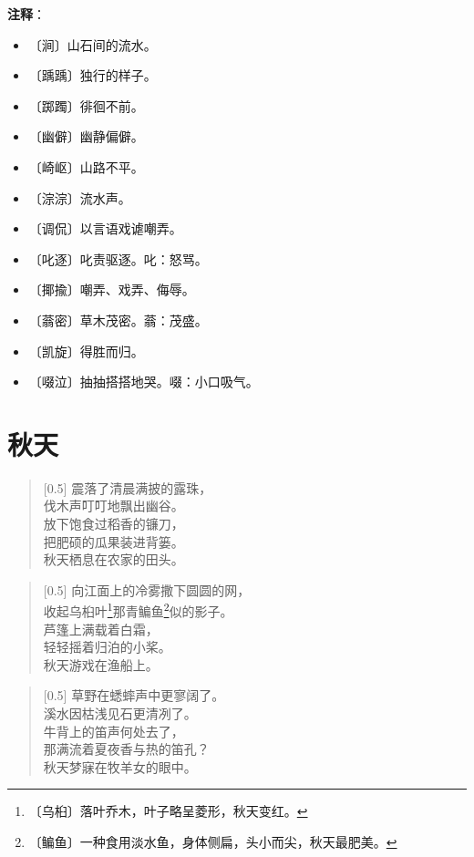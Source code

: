 \documentclass[12pt,UTF-8,openany]{ctexbook}
\begin{document}
\newpage

\textbf{注释}：

\vspace{-1em}

\begin{itemize}
    \setlength\itemsep{-0.2em}
    \item 〔涧〕山石间的流水。
    \item 〔踽踽〕独行的样子。
    \item 〔踯躅〕徘徊不前。
    \item 〔幽僻〕幽静偏僻。
    \item 〔崎岖〕山路不平。
    \item 〔淙淙〕流水声。
    \item 〔调侃〕以言语戏谑嘲弄。
    \item 〔叱逐〕叱责驱逐。叱：怒骂。
    \item 〔揶揄〕嘲弄、戏弄、侮辱。
    \item 〔蓊密〕草木茂密。蓊：茂盛。
    \item 〔凯旋〕得胜而归。
    \item 〔啜泣〕抽抽搭搭地哭。啜：小口吸气。
\end{itemize}

\chapter{秋天}

\begin{large}
    
    \begin{verse}[0.5\linewidth]
        震落了清晨满披的露珠， \\
        伐木声叮叮地飘出幽谷。 \\
        放下饱食过稻香的镰刀， \\
        把肥硕的瓜果装进背篓。 \\
        秋天栖息在农家的田头。
    \end{verse}
    
    
    \begin{verse}[0.5\linewidth]
        向江面上的冷雾撒下圆圆的网， \\
        收起乌桕叶\footnote{〔乌桕〕落叶乔木，叶子略呈菱形，秋天变红。}那青鳊鱼\footnote{〔鳊鱼〕一种食用淡水鱼，身体侧扁，头小而尖，秋天最肥美。}似的影子。 \\
        芦篷上满载着白霜， \\
        轻轻摇着归泊的小桨。 \\
        秋天游戏在渔船上。
    \end{verse}
    
    
    \begin{verse}[0.5\linewidth]
        草野在蟋蟀声中更寥阔了。 \\
        溪水因枯浅见石更清冽了。 \\
        牛背上的笛声何处去了， \\
        那满流着夏夜香与热的笛孔？ \\
        秋天梦寐在牧羊女的眼中。
    \end{verse}
    
\end{large}
\end{document}
